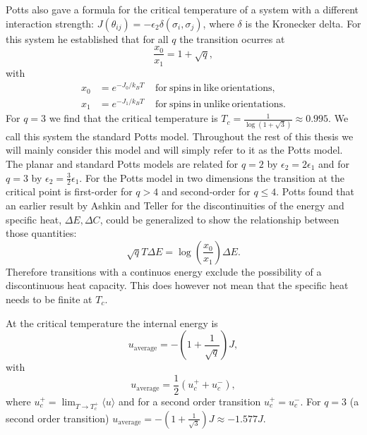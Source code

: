 \documentclass[11pt, a4paper]{report} %
\begin{document}
Potts also gave a formula for the critical temperature of a system with a different interaction strength: \(J(\theta_{ij}) = -\epsilon_2 \delta(\sigma_i, \sigma_j)\), where \(\delta\) is the Kronecker delta.
For this system he established that for all \(q\) the transition ocurres at\cite{potts:1952}
\begin{equation}
	\frac{x_0}{x_1} = 1 + \sqrt{q},
\end{equation}
with
\begin{align}
	x_0 &= e^{-J_0 / k_B T} \mathrm{\ \ \ \ \ for\ spins\ in\ like\ orientations,}\\
	x_1 & = e^{-J_1 / k_B T} \mathrm{\ \ \ \ \ for\ spins\ in\ unlike\ orientations}.
\end{align}
For \(q=3\) we find that the critical temperature is \(T_c=\frac{1}{\log(1+\sqrt{3})} \approx 0.995\).\cite{fan:2007}
We call this system the standard Potts model.
Throughout the rest of this thesis we will mainly consider this model and will simply refer to it as the Potts model.
The planar and standard Potts models are related for \(q = 2\) by \(\epsilon_2 = 2 \epsilon_1\) and for \(q=3\) by \(\epsilon_2 = \frac{3}{2} \epsilon_1\).
For the Potts model in two dimensions the transition at the critical point is first-order for \(q > 4\) and second-order for \(q \leq 4\).\cite{wu:1982,baxter:1973}
Potts found that an earlier result by Ashkin and Teller for the discontinuities of the energy and specific heat\cite{ashkin:1943}, \(\Delta E, \Delta C\), could be generalized to show the relationship between those quantities:
\begin{equation}
	\sqrt{q}T \Delta E = \log(\frac{x_0}{x_1}) \Delta E.
\end{equation}
Therefore transitions with a continuos energy exclude the possibility of a discontinuous heat capacity.
This does however not mean that the specific heat needs to be finite at \(T_c\).


At the critical temperature the internal energy is\cite{baxter:1989,binder:1981a}
\begin{equation}
	u_{\mathrm{average}} = -\left(1+\frac{1}{\sqrt{q}}\right)J,
\end{equation}
with
\begin{equation}
	u_{\mathrm{average}} = \frac{1}{2} (u_c^+ + u_c^-),
\end{equation}
where \(u_c^+ = \lim_{T \to T_c^+} \langle u \rangle\) and for a second order transition \(u_c^+ = u_c^-\).
For \(q=3\) (a second order transition) \(u_{\mathrm{average}} = -(1+\frac{1}{\sqrt{3}})J \approx - 1.577 J\).
\end{document}
